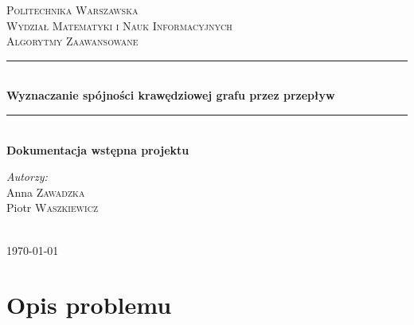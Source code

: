 \documentclass{article}
\begin{document}
	
\begin{titlepage}

\newcommand{\HRule}{\rule{\linewidth}{0.5mm}}

\center


\textsc{\LARGE Politechnika Warszawska}\\[5mm]
\textsc{\LARGE Wydział Matematyki i Nauk Informacyjnych}\\[4cm]
 

\textsc{\Huge Algorytmy Zaawansowane}\\[0.5cm]


\HRule \\[0.4cm]
{ \LARGE \bfseries Wyznaczanie spójności krawędziowej grafu przez przepływ}\\[0.2cm]
 

\HRule \\[0.4cm]
{  \bfseries Dokumentacja wstępna projektu}\\[2.5cm]
 

\begin{flushright}
\Large \emph{Autorzy:}\\[0.5cm]
Anna \textsc{Zawadzka}\\
Piotr \textsc{Waszkiewicz}\\
\end{flushright}
\\[3.5cm]

\vfill
{\large \today}\\[3cm]

\end{titlepage}
	
\newpage

\section{Opis problemu}\\
\end{document}
